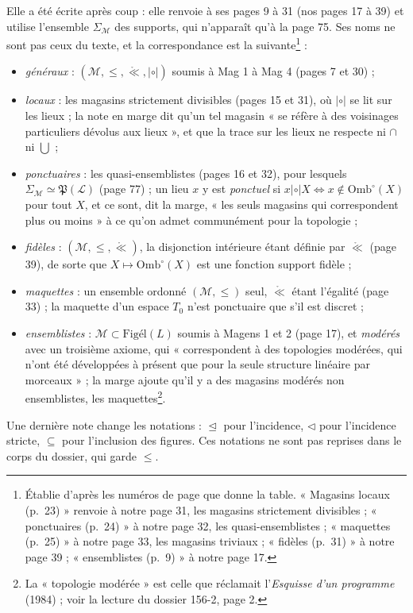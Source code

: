 \documentclass[11pt,a4paper]{article}
\begin{document}
Elle a été écrite après coup : elle renvoie à ses pages 9 à 31 (nos pages 17 à
39) et utilise l'ensemble $\Sigma_{\mathcal{M}}$ des supports, qui n'apparaît
qu'à la page 75. Ses noms ne sont pas ceux du texte, et la correspondance est
la suivante\footnote{Établie d'après les numéros de page que donne la table.
« Magasins locaux (p.~23) » renvoie à notre page 31, les magasins strictement
divisibles ; « ponctuaires (p.~24) » à notre page 32, les quasi-ensemblistes ;
« maquettes (p.~25) » à notre page 33, les magasins triviaux ; « fidèles
(p.~31) » à notre page 39 ; « ensemblistes (p.~9) » à notre page 17.} :
\begin{itemize}
\item[--] \emph{généraux} : $(\mathcal{M}, \leq, \mathring{\ll},
\mathrel{|\circ|})$ soumis à Mag 1 à Mag 4 (pages 7 et 30) ;
\item[--] \emph{locaux} : les magasins strictement divisibles (pages 15 et 31),
où $\mathrel{|\circ|}$ se lit sur les lieux ; la note en marge dit qu'un tel
magasin « se réfère à des voisinages particuliers dévolus aux lieux », et que
la trace sur les lieux ne respecte ni $\cap$ ni $\bigcup$ ;
\item[--] \emph{ponctuaires} : les quasi-ensemblistes (pages 16 et 32), pour
lesquels $\Sigma_{\mathcal{M}} \simeq \mathfrak{P}(\mathcal{L})$ (page 77) ;
un lieu $x$ y est \emph{ponctuel} si $x \mathrel{|\circ|} X \Leftrightarrow x
\notin \mathrm{Omb}^{\circ}(X)$ pour tout $X$, et ce sont, dit la marge, « les
seuls magasins qui correspondent plus ou moins » à ce qu'on admet communément
pour la topologie ;
\item[--] \emph{fidèles} : $(\mathcal{M}, \leq, \mathring{\ll})$, la
disjonction intérieure étant définie par $\mathring{\ll}$ (page 39), de sorte
que $X \mapsto \mathrm{Omb}^{\circ}(X)$ est une fonction support fidèle ;
\item[--] \emph{maquettes} : un ensemble ordonné $(\mathcal{M}, \leq)$ seul,
$\mathring{\ll}$ étant l'égalité (page 33) ; la maquette d'un espace $T_{0}$
n'est ponctuaire que s'il est discret ;
\item[--] \emph{ensemblistes} : $\mathcal{M} \subset \mathrm{Figél}(L)$ soumis
à Magens 1 et 2 (page 17), et \emph{modérés} avec un troisième axiome, qui
« correspondent à des topologies modérées, qui n'ont été développées à présent
que pour la seule structure linéaire par morceaux » ; la marge ajoute qu'il y a
des magasins modérés non ensemblistes, les maquettes\footnote{La « topologie
modérée » est celle que réclamait l'\emph{Esquisse d'un programme} (1984) ;
voir la lecture du dossier 156-2, page 2.}.
\end{itemize}
Une dernière note change les notations : $\trianglelefteq$ pour l'incidence,
$\lhd$ pour l'incidence stricte, $\subseteq$ pour l'inclusion des figures.
Ces notations ne sont pas reprises dans le corps du dossier, qui garde $\leq$.
\end{document}
